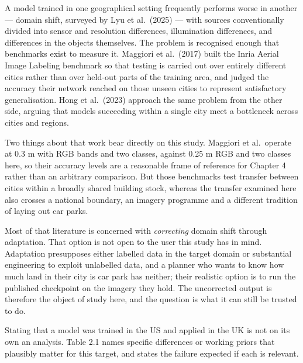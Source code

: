 A model trained in one geographical setting frequently performs worse in another --- domain shift, surveyed by Lyu et al.~(2025) --- with sources conventionally divided into sensor and resolution differences, illumination differences, and differences in the objects themselves. The problem is recognised enough that benchmarks exist to measure it. Maggiori et al.~(2017) built the Inria Aerial Image Labeling benchmark so that testing is carried out over entirely different cities rather than over held-out parts of the training area, and judged the accuracy their network reached on those unseen cities to represent satisfactory generalisation. Hong et al.~(2023) approach the same problem from the other side, arguing that models succeeding within a single city meet a bottleneck across cities and regions.

Two things about that work bear directly on this study. Maggiori et al.~operate at 0.3 m with RGB bands and two classes, against 0.25 m RGB and two classes here, so their accuracy levels are a reasonable frame of reference for Chapter 4 rather than an arbitrary comparison. But those benchmarks test transfer between cities within a broadly shared building stock, whereas the transfer examined here also crosses a national boundary, an imagery programme and a different tradition of laying out car parks.

Most of that literature is concerned with \emph{correcting} domain shift through adaptation. That option is not open to the user this study has in mind. Adaptation presupposes either labelled data in the target domain or substantial engineering to exploit unlabelled data, and a planner who wants to know how much land in their city is car park has neither; their realistic option is to run the published checkpoint on the imagery they hold. The uncorrected output is therefore the object of study here, and the question is what it can still be trusted to do.

Stating that a model was trained in the US and applied in the UK is not on its own an analysis. Table 2.1 names specific differences or working priors that plausibly matter for this target, and states the failure expected if each is relevant.

